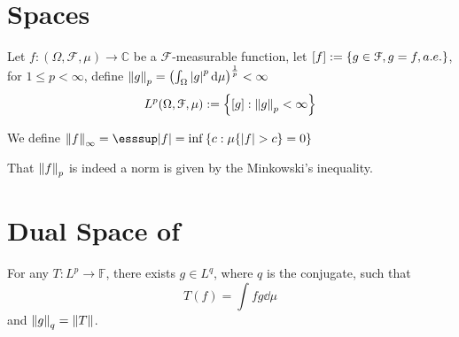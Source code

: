 \section{ Spaces}

Let \(f: (\Omega, \mathcal{F}, \mu) \to \mathbb{C}\) be a \(\mathcal{F}\)-measurable function, let \([f]:= \Bqty{g \in \mathcal{F}, g = f, a.e.}\), for \(1 \leq p < \infty\), define \(\norm{g}_{p} = \pqty{\int_{\Omega} \abs{g}^{p} \dd{\mu}}^{\frac{1}{p}} < \infty\)
\begin{equation*}
    L^{p}(\Omega, \mathcal{F}, \mu) := \Bqty{[g]: \norm{g}_{p} < \infty}
\end{equation*}

We define \(\norm{f}_{\infty} = \esssup \abs{f} = \inf \Bqty{c: \mu\Bqty{\abs{f}> c} = 0}\)

That \(\norm{f}_{p}\) is indeed a norm is given by the Minkowski's inequality. 

\section{Dual Space of }

For any  \(T : L^{p} \to \mathbb{F}\), there exists \(g \in L^{q}\), where \(q\) is the conjugate, such that 
\begin{equation*}
    T(f) = \int fg \dd{\mu}
\end{equation*}
and \(\norm{g}_{q} = \norm{T}\).



